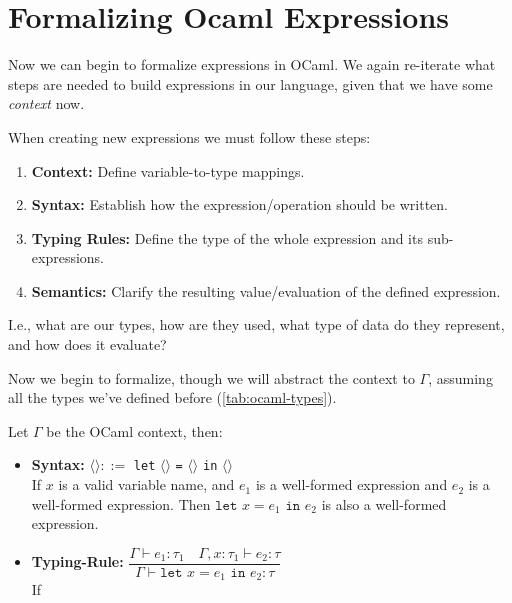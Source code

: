 \section{Formalizing Ocaml Expressions}

Now we can begin to formalize expressions
in OCaml. We again re-iterate what steps are needed to build expressions
in our language, given that we have some \textit{context} now.

\begin{Def}

    When creating new expressions we must follow these steps:
    \begin{enumerate}
        \item \textbf{Context:} Define variable-to-type mappings.
        \item \textbf{Syntax:} Establish how the expression/operation should be written.
        \item \textbf{Typing Rules:} Define the type of the whole expression and its sub-expressions.
        \item \textbf{Semantics:} Clarify the resulting value/evaluation of the defined expression.
    \end{enumerate}
    I.e., what are our types, how are they used, what type of data do they represent, and how does it evaluate?
\end{Def}

Now we begin to formalize, though we will abstract the context to $\Gamma$, assuming 
all the types we've defined before (\ref{tab:ocaml-types}).
\begin{Def}

    Let $\Gamma$ be the OCaml context, then:
    \begin{itemize}
        \item \textbf{Syntax:} \LARGE $\langle$$\rangle::=$ \texttt{let} $\langle$$\rangle$ \texttt{=} $\langle$$\rangle$ \texttt{in} $\langle$$\rangle$ \normalsize\\
        
        \noindent
        If $x$ is a valid variable name, and $e_1$ is a well-formed expression and $e_2$ is a well-formed expression. Then $\texttt{let }x=e_1\texttt{ in }e_2$ is also a well-formed expression.
        \item \textbf{Typing-Rule:} \LARGE $\dfrac{\Gamma\vdash e_1:\tau_1 \quad \Gamma,x:\tau_1\vdash e_2:\tau}{\Gamma\vdash\texttt{let }x=e_1\texttt{ in }e_2:\tau}$ \normalsize\\
        
        \noindent
        If 
    \end{itemize}

\end{Def}
